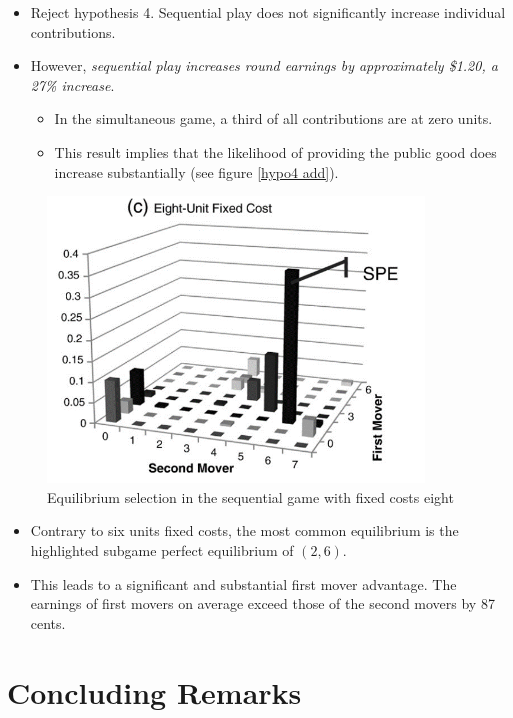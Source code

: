 \documentclass[../root]{subfiles}
\begin{document}
    \begin{itemize}
        \item Reject hypothesis 4. Sequential play does not significantly increase individual contributions.
        \item However, \textit{sequential play increases round earnings by approximately \$1.20, a 27\% increase}.
        \begin{itemize}
            \item In the simultaneous game, a third of all contributions are at zero units.
            \item This result implies that the likelihood of providing the public good does increase substantially (see figure \ref{hypo4 add}).
        \end{itemize}
    \end{itemize}

    \begin{figure}[H]
        \centering
        \includegraphics[width = 10cm]{0605kato/eqm_FC8.png}
        \caption{Equilibrium selection in the sequential game with fixed costs eight}
        \label{eqm fc8}
    \end{figure}

    \begin{itemize}
        \item Contrary to six units fixed costs, the most common equilibrium is the highlighted subgame perfect equilibrium of $(2,6)$.
        \item This leads to a significant and substantial first mover advantage. The earnings of first movers on average exceed those of the second movers by 87 cents. 
    \end{itemize}


    \section{Concluding Remarks}
\end{document}
